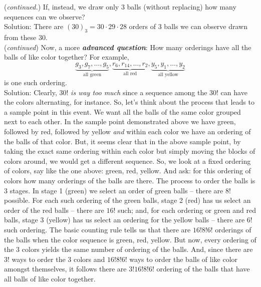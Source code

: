\documentclass[12pt]{article}
\begin{document}
\noindent ({\em continued.}) If, instead, we draw only 3 balls (without replacing) how many sequences can we observe? \\

\noindent Solution: There are $(30)_3=30\cdot 29\cdot 28$ orders of 3 balls we can observe drawn from these 30.\\

\noindent ({\em continued}) Now, a more {\bf\em advanced question}\label{30ballsadvancedquestion}: How many orderings have all the balls of like color together?  For example,
$$\underbrace{g_3,g_7,\dots, g_5}_{\mbox{all green}},
\underbrace{r_6,r_{14},\dots,r_2}_{\mbox{all red}}, \underbrace{y_5,y_1,\dots, y_2}_{\mbox{all yellow}}$$
is one such ordering.\\

\noindent Solution: Clearly, $30!$ {\em is way too much} since a sequence among the $30!$ can have the colors alternating, for instance.
So, let's think about the process that leads to a sample point in this event.  We want all the balls of the same color grouped next to each other.
In the sample point demonstrated above we have green, followed by red, followed by yellow {\em and} within each color we have an ordering of the balls of that color.
But, it seems clear that in the above sample point, by taking the exact same ordering within each color but simply moving the blocks of colors around, we would get a different sequence. So, we look at a fixed ordering of colors, say like the one above: green, red, yellow. And ask: for this ordering of colors how many orderings of the balls are there.
The process to order the balls is 3 stages. In stage 1 (green) we select an order of green balls -- there are $8!$ possible. For each such ordering of the green balls, stage 2 (red) has us select an order of the red balls -- there are $16!$ such; and, for each ordering or green and red balls, stage 3 (yellow) has us select an ordering for the yellow balls -- there are $6!$ such ordering. The basic counting rule tells us that there are $16!8!6!$ orderings of the balls when the color sequence is green, red, yellow.
But now, every ordering of the 3 colors yields the same number of ordering of the balls.  And, since there are $3!$ ways to order the 3 colors and $16!8!6!$ ways to order the balls of like color amongst themselves, it follows there are $3!16!8!6!$ ordering of the balls that have all balls of like color together.\\


\newpage
\end{document}
